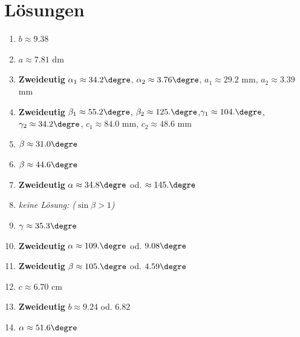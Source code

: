 \section*{Lösungen}
\begin{minipage}[t]{0.45\textwidth}
\begin{enumerate}[series=loesungen]
    \item $b \approx 9.38$
    \item $a \approx 7.81$ dm
    \item \textbf{Zweideutig} $\alpha_1 \approx  34.2\degre $,
    $\alpha_2 \approx 3.76\degre $, $a_1 \approx 29.2$ mm, $a_2 \approx 3.39$ mm
    \item \textbf{Zweideutig} $\beta_1 \approx  55.2\degre $,
    $\beta_2 \approx 125.\degre $,$\gamma_1 \approx  104.\degre $,
    $\gamma_2 \approx 34.2\degre $, $c_1 \approx 84.0$ mm, $c_2 \approx 48.6$ mm
    \item $\beta \approx 31.0\degre$
    \item $\beta \approx 44.6\degre$
    \item  \textbf{Zweideutig} $\alpha \approx 34.8\degre$ od. $\approx 145.\degre$
    \item \textit{keine Lösung: ($\sin \beta > 1$)}
    \item $\gamma \approx 35.3\degre$
    \item \textbf{Zweideutig}  $\alpha \approx 109.\degre$ od. $9.08\degre$
    \item \textbf{Zweideutig}  $\beta \approx 105.\degre$ od. $4.59\degre$
    \item $c \approx 6.70$ cm
    \item \textbf{Zweideutig}  $b \approx 9.24$ od. $6.82$
    \item $\alpha \approx 51.6\degre$
\end{enumerate}
\end{minipage}
\hfill
